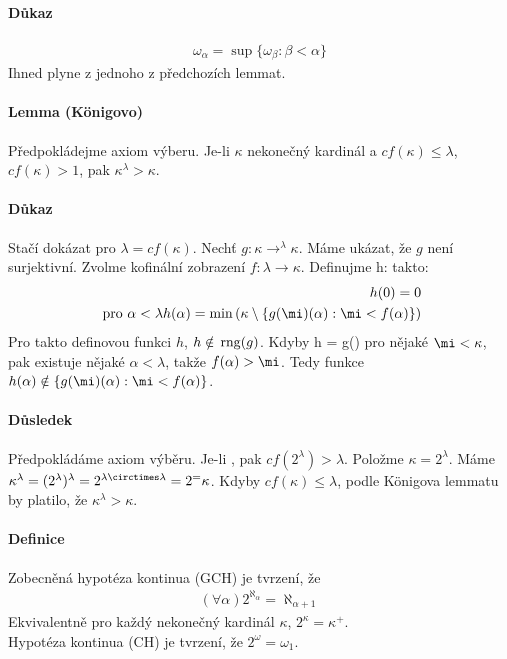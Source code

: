 \documentclass[a4paper,12pt,titlepage]{article}
\begin{document}
\begin{enumerate}
\paragraph{Důkaz}
\begin{align}
	\omega_\alpha = \sup\{\omega_\beta : \beta < \alpha \}
\end{align}
Ihned plyne z jednoho z předchozích lemmat.
\paragraph{Lemma (Königovo)}
Předpokládejme axiom výberu. Je-li $\kappa$ nekonečný kardinál a $cf(\kappa) \le
\lambda$, $cf(\kappa) > 1$, pak $\kappa^\lambda > \kappa$.
\paragraph{Důkaz}
Stačí dokázat pro $\lambda = cf(\kappa)$. 
Nechť $g : \kappa \to ^\lambda \kappa$. Máme ukázat, že $g$ není surjektivní.
Zvolme kofinální zobrazení $f: \lambda \to \kappa$. Definujme h: \lambda \to
\kappa takto: 
\begin{align}
	h(0) = 0 \\
	\text{ pro } \alpha < \lambda h(\alpha) = \min \left( \kappa \setminus
	\{g(\mi)(\alpha) : \mi < f(\alpha) \} \right)
\end{align}
Pro takto definovou funkci $h$, $h \notin \operatorname*{\,rng}(g)$. Kdyby h = g(\mi) pro nějaké
$\mi <\kappa$, pak existuje nějaké $\alpha <\lambda$, takže $f(\alpha) >\mi$.
Tedy funkce $h(\alpha) \nin \{g(\mi)(\alpha) : \mi < f(\alpha)\}$.
\paragraph{Důsledek}
Předpokládáme axiom výběru. Je-li \lambda \ge \omega, pak $cf(2^\lambda) >
\lambda$. Položme $\kappa = 2^\lambda$. Máme $\kappa^\lambda = (2^\lambda)^\lambda
= 2^{\lambda \circtimes\lambda} = 2^ = \kappa$. Kdyby $cf(\kappa) \le \lambda$,
podle Königova lemmatu by platilo, že $\kappa^\lambda > \kappa$.
\paragraph{Definice}
Zobecněná hypotéza kontinua (GCH) je tvrzení, že 
\begin{align}
	(\forall \alpha) 2^{\aleph_\alpha} = \aleph_{\alpha + 1}
\end{align}
Ekvivalentně pro každý nekonečný kardinál $\kappa$, $2^\kappa = \kappa^+$. \\
Hypotéza kontinua (CH) je tvrzení, že $2^\omega = \omega_1$.

\end{enumerate}
\end{document}
